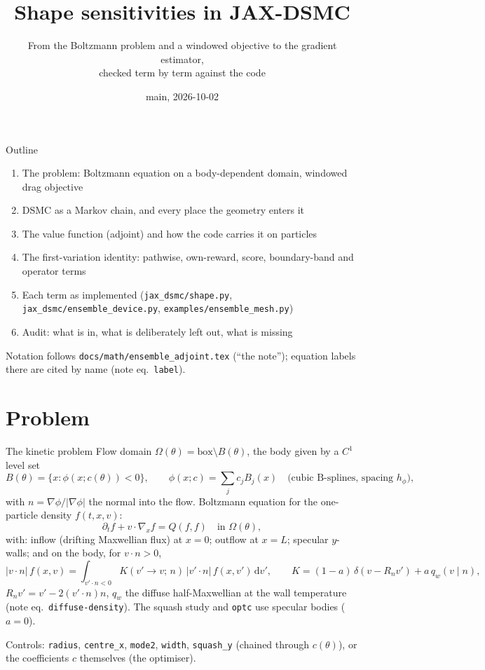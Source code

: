 \documentclass[10pt,aspectratio=169]{beamer}
\title{Shape sensitivities in JAX-DSMC}
\subtitle{From the Boltzmann problem and a windowed objective to the gradient estimator,\\
checked term by term against the code}
\date{main, 2026-10-02}
\newcommand{\dd}{\mathrm{d}}
\newcommand{\code}[1]{\texttt{\small #1}}
\begin{document}
\begin{frame}
\titlepage
\end{frame}

\begin{frame}{Outline}
\begin{enumerate}
\item The problem: Boltzmann equation on a body-dependent domain, windowed drag objective
\item DSMC as a Markov chain, and every place the geometry enters it
\item The value function (adjoint) and how the code carries it on particles
\item The first-variation identity: pathwise, own-reward, score, boundary-band and
  operator terms
\item Each term as implemented (\code{jax\_dsmc/shape.py},
  \code{jax\_dsmc/ensemble\_device.py}, \code{examples/ensemble\_mesh.py})
\item Audit: what is in, what is deliberately left out, what is missing
\end{enumerate}
\vspace{1em}
Notation follows \code{docs/math/ensemble\_adjoint.tex} (``the note''); equation
labels there are cited by name (note eq.\ \code{label}).
\end{frame}

\section{Problem}

\begin{frame}{The kinetic problem}
Flow domain $\Omega(\theta) = \text{box} \setminus B(\theta)$, the body given by a $C^1$
level set
\[
B(\theta) = \{x : \phi(x; c(\theta)) < 0\},\qquad
\phi(x;c) = \sum_j c_j B_j(x)\quad\text{(cubic B-splines, spacing } h_\phi),
\]
with $n = \nabla\phi/|\nabla\phi|$ the normal into the flow.
Boltzmann equation for the one-particle density $f(t,x,v)$:
\[
\partial_t f + v\cdot\nabla_x f = Q(f,f)\quad\text{in } \Omega(\theta),
\]
with: inflow (drifting Maxwellian flux) at $x = 0$; outflow at $x = L$; specular
$y$-walls; and on the body, for $v\cdot n > 0$,
\[
|v\cdot n|\, f(x, v) = \int_{v'\cdot n<0} K(v' \to v;\, n)\, |v'\cdot n|\, f(x, v')\,\dd v' ,
\qquad
K = (1-a)\,\delta(v - R_n v') + a\, q_w(v\mid n),
\]
$R_n v' = v' - 2(v'\cdot n)n$, $q_w$ the diffuse half-Maxwellian at the wall temperature
(note eq.\ \code{diffuse-density}).  The squash study and \code{optc} use specular bodies ($a = 0$).

\medskip
Controls: \code{radius}, \code{centre\_x}, \code{mode2}, \code{width}, \code{squash\_y}
(chained through $c(\theta)$), or the coefficients $c$ themselves (the optimiser).
\end{frame}
\end{document}
